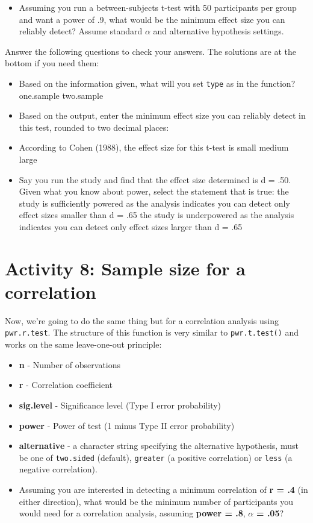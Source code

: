 \documentclass[]{book}
\providecommand{\tightlist}{%
  \setlength{\itemsep}{0pt}\setlength{\parskip}{0pt}}
\begin{document}
\begin{itemize}
\tightlist
\item
  Assuming you run a between-subjects t-test with 50 participants per group and want a power of .9, what would be the minimum effect size you can reliably detect? Assume standard \(\alpha\) and alternative hypothesis settings.
\end{itemize}

Answer the following questions to check your answers. The solutions are at the bottom if you need them:

\begin{itemize}
\tightlist
\item
  Based on the information given, what will you set \texttt{type} as in the function? one.sample two.sample
\item
  Based on the output, enter the minimum effect size you can reliably detect in this test, rounded to two decimal places: 
\item
  According to Cohen (1988), the effect size for this t-test is small medium large
\item
  Say you run the study and find that the effect size determined is d = .50. Given what you know about power, select the statement that is true: the study is sufficiently powered as the analysis indicates you can detect only effect sizes smaller than d = .65 the study is underpowered as the analysis indicates you can detect only effect sizes larger than d = .65
\end{itemize}

\hypertarget{activity-8-sample-size-for-a-correlation}{%
\section{Activity 8: Sample size for a correlation}\label{activity-8-sample-size-for-a-correlation}}

Now, we're going to do the same thing but for a correlation analysis using \texttt{pwr.r.test}. The structure of this function is very similar to \texttt{pwr.t.test()} and works on the same leave-one-out principle:

\begin{itemize}
\item
  \textbf{n} - Number of observations
\item
  \textbf{r} - Correlation coefficient
\item
  \textbf{sig.level} - Significance level (Type I error probability)
\item
  \textbf{power} - Power of test (1 minus Type II error probability)
\item
  \textbf{alternative} - a character string specifying the alternative hypothesis, must be one of \texttt{two.sided} (default), \texttt{greater} (a positive correlation) or \texttt{less} (a negative correlation).
\item
  Assuming you are interested in detecting a minimum correlation of \textbf{r = .4} (in either direction), what would be the minimum number of participants you would need for a correlation analysis, assuming \textbf{power = .8}, \(\alpha\) \textbf{= .05}?
\end{itemize}
\end{document}
